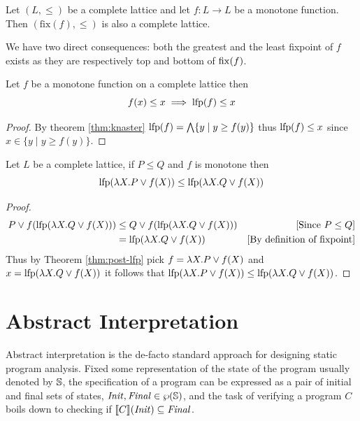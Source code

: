 \documentclass[
  10pt,       %
  twoside,    %
  a4paper,    %
  english,    %
  tikz,       %
  openright,  %
]{book}
\begin{document}
\begin{theorem}
  \label{thm:knaster}
  Let $(L, \leq)$ be a complete lattice and let $f : L \to L$ be a monotone 
  function. Then $(\text{fix}(f), \leq)$ is also a complete lattice.
\end{theorem}

We have two direct consequences: both the greatest and the least fixpoint of
$f$ exists as they are respectively top and bottom of $\mathrm{fix}(f)$.

\begin{theorem}
  \label{thm:post-lfp}
  Let $f$ be a monotone function on a complete lattice then
  $$f(x) \leq x \implies \mathrm{lfp}(f) \leq x$$
\end{theorem}
\begin{proof}
  By theorem \ref{thm:knaster} $\mathrm{lfp}(f) = \bigwedge\{ y \mid y \geq f(y) \}$
  thus $\mathrm{lfp}(f) \leq x$ since $x \in \{ y \mid y \geq f(y) \}$.
\end{proof}

\begin{theorem}
  \label{thm:lfp-mono}
  Let $L$ be a complete lattice, if $P \leq Q$ and $f$ is monotone then
  $$\mathrm{lfp}(\lambda X. P \lor f(X)) \leq \mathrm{lfp}(\lambda X. Q \lor f(X))$$
\end{theorem}
\begin{proof}
  \begin{align*}
    P \lor f(\mathrm{lfp}(\lambda X . Q \lor f(X)))
      &\leq Q \lor f(\mathrm{lfp}(\lambda X . Q \lor f(X)))
      &\text{[Since $P \leq Q$]} \\
      &= \mathrm{lfp}(\lambda X . Q \lor f(X))
      &\text{[By definition of fixpoint]} \\
  \end{align*}
  Thus by Theorem \ref{thm:post-lfp} pick $f = \lambda X . P \lor f(X)$ and
  $x = \mathrm{lfp}(\lambda X. Q \lor f(X))$ it follows that
  $\mathrm{lfp}(\lambda X. P \lor f(X)) \leq \mathrm{lfp}(\lambda X. Q \lor f(X))$.
\end{proof}

\section{Abstract Interpretation}

Abstract interpretation \cite{Cousot77, Cousot21} is the de-facto standard
approach for designing static program analysis. Fixed some representation of the
state of the program usually denoted by $\mathbb{S}$, the specification of a
program can be expressed as a pair of initial and final sets of states,
$\mathit{Init}, \mathit{Final} \in \wp(\mathbb{S})$, and the task of verifying a
program $C$ boils down to checking if $\llbracket C \rrbracket(\mathit{Init}) \subseteq
\mathit{Final}$.
\end{document}
